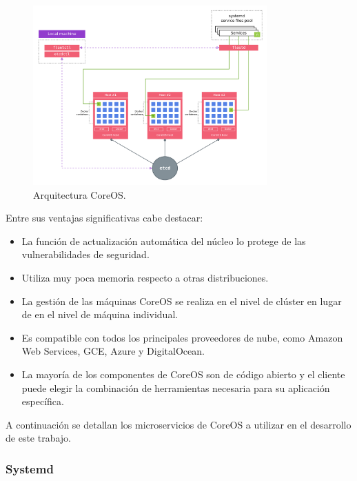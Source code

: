 \begin{figure}[H]
\centering
\includegraphics[width=0.8\textwidth]{images/figures/coreosarchitecture.png}
\caption{Arquitectura CoreOS.\footnotemark}
\end{figure}

Entre sus ventajas significativas cabe destacar:

\begin{itemize}
\item La función de actualización automática del núcleo lo protege de las vulnerabilidades de seguridad.
\item Utiliza muy poca memoria respecto a otras distribuciones.
\item La gestión de las máquinas CoreOS se realiza en el nivel de clúster en lugar de en el nivel de máquina individual.
\item Es compatible con todos los principales proveedores de nube, como Amazon Web Services, GCE, Azure y DigitalOcean.
\item La mayoría de los componentes de CoreOS son de código abierto y el cliente puede elegir la combinación de herramientas necesaria para su aplicación específica.
\end{itemize}

A continuación se detallan los microservicios de CoreOS a utilizar en el desarrollo de este trabajo.

\subsubsection{Systemd}

